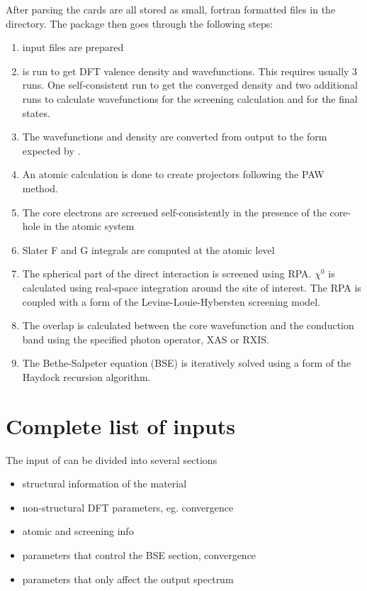 \documentclass[11pt]{report}
\begin{document}
After parsing the cards are all stored as small, fortran formatted files in the  directory. The package then goes through the following steps:
\begin{enumerate}
\item {} input files are prepared
\item {} is run to get DFT valence density and wavefunctions. This requires usually 3 runs. One self-consistent run to get the converged density and two additional runs to calculate wavefunctions for the screening calculation and for the final states.
\item The wavefunctions and density are converted from  output to the form expected by \OCEAN{}.
\item An atomic calculation is done to create projectors following the PAW method.
\item The core electrons are screened self-consistently in the presence of the core-hole in the atomic system
\item Slater F and G integrals are computed at the atomic level
\item The spherical part of the direct interaction is screened using RPA. $\chi^0$ is calculated using real-space integration around the site of interest. The RPA is coupled with a form of the Levine-Louie-Hybersten screening model.
\item The overlap is calculated between the core wavefunction and the conduction band using the specified photon operator, XAS or RXIS.
\item The Bethe-Salpeter equation (BSE) is iteratively solved using a form of the Haydock recursion algorithm.
\end{enumerate}


\section{Complete list of \OCEAN{} inputs}

The input of \OCEAN{} can be divided into several sections

\begin{itemize}
\item structural information of the material
\item non-structural DFT parameters, eg. convergence
\item atomic and screening info
\item parameters that control the BSE section, convergence
\item parameters that only affect the output spectrum
\end{itemize}
\end{document}
